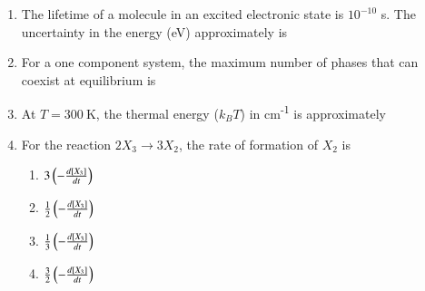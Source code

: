 \documentclass[12pt]{article}
\begin{document}
\begin{enumerate}
    

    \item The lifetime of a molecule in an excited electronic state is $10^{-10}$ s. The uncertainty in the energy (eV) approximately is
    \begin{enumerate}
 \hfill{}
\end{enumerate}
    

    \item For a one component system, the maximum number of phases that can coexist at equilibrium is
    \begin{enumerate}
\end{enumerate}
    

    \item At $T = 300 \ \mathrm{K}$, the thermal energy ($k_B T$) in cm\textsuperscript{-1} is approximately
    \begin{enumerate}
\end{enumerate}

    

    \item For the reaction $2 X_3 \rightarrow 3 X_2$, the rate of formation of $X_2$ is
\begin{enumerate}

\item $3 \left(-\frac{d[X_3]}{dt}\right)$
\item $\frac{1}{2} \left(-\frac{d[X_3]}{dt}\right)$
\item $\frac{1}{3} \left(-\frac{d[X_3]}{dt}\right)$
\item $\frac{3}{2} \left(-\frac{d[X_3]}{dt}\right)$  \hfill{}
\end{enumerate}




\end{enumerate}
\end{document}

